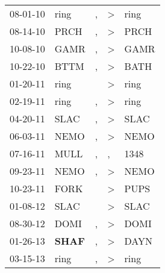 \begin{supertabular}{p{0.07\textwidth}p{0.06\textwidth}p{0.02\textwidth}p{0.02\textwidth}p{0.06\textwidth}}
 08-01-10\textsuperscript{} &           ring\textsuperscript{} &             , &     \textgreater &  ring\textsuperscript{} \\
 08-14-10\textsuperscript{} &           PRCH\textsuperscript{} &             , &     \textgreater &  PRCH\textsuperscript{} \\
 10-08-10\textsuperscript{} &           GAMR\textsuperscript{} &             , &     \textgreater &  GAMR\textsuperscript{} \\
 10-22-10\textsuperscript{} &           BTTM\textsuperscript{} &             , &     \textgreater &  BATH\textsuperscript{} \\
 01-20-11\textsuperscript{} &           ring\textsuperscript{} &               &     \textgreater &  ring\textsuperscript{} \\
 02-19-11\textsuperscript{} &           ring\textsuperscript{} &             , &     \textgreater &  ring\textsuperscript{} \\
 04-20-11\textsuperscript{} &           SLAC\textsuperscript{} &             , &     \textgreater &  SLAC\textsuperscript{} \\
 06-03-11\textsuperscript{} &           NEMO\textsuperscript{} &             , &     \textgreater &  NEMO\textsuperscript{} \\
 07-16-11\textsuperscript{} &           MULL\textsuperscript{} &             , &                , &  1348\textsuperscript{} \\
 09-23-11\textsuperscript{} &           NEMO\textsuperscript{} &             , &     \textgreater &  NEMO\textsuperscript{} \\
 10-23-11\textsuperscript{} &           FORK\textsuperscript{} &               &     \textgreater &  PUPS\textsuperscript{} \\
 01-08-12\textsuperscript{} &           SLAC\textsuperscript{} &               &     \textgreater &  SLAC\textsuperscript{} \\
 08-30-12\textsuperscript{} &           DOMI\textsuperscript{} &             , &     \textgreater &  DOMI\textsuperscript{} \\
 01-26-13\textsuperscript{} &  \textbf{SHAF\textsuperscript{}} &             , &     \textgreater &  DAYN\textsuperscript{} \\
 03-15-13\textsuperscript{} &           ring\textsuperscript{} &             , &     \textgreater &  ring\textsuperscript{} \\

\end{supertabular}
